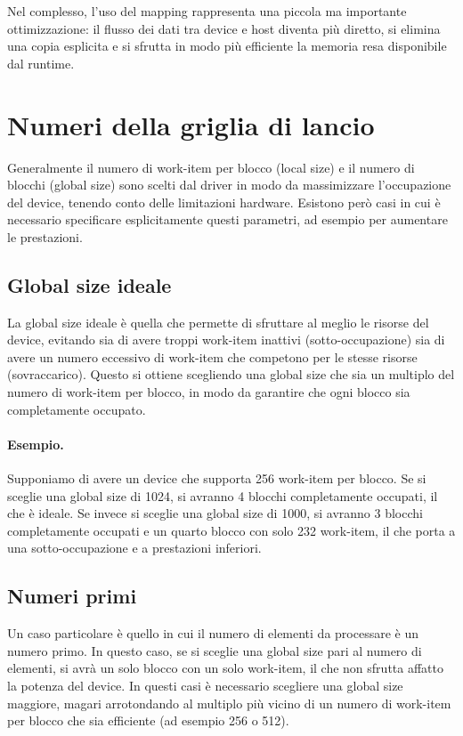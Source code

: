 Nel complesso, l’uso del mapping rappresenta una piccola ma importante ottimizzazione: il flusso dei dati tra device e host diventa più diretto, si elimina una copia esplicita e si sfrutta in modo più efficiente la memoria resa disponibile dal runtime.

\section{Numeri della griglia di lancio}
Generalmente il numero di work-item per blocco (local size) e il numero di blocchi (global size) sono scelti dal driver in modo da massimizzare l’occupazione del device, tenendo conto delle limitazioni hardware. Esistono però casi in cui è necessario specificare esplicitamente questi parametri, ad esempio per aumentare le prestazioni.

\subsection{Global size ideale}
La global size ideale è quella che permette di sfruttare al meglio le risorse del device, evitando sia di avere troppi work-item inattivi (sotto-occupazione) sia di avere un numero eccessivo di work-item che competono per le stesse risorse (sovraccarico). Questo si ottiene scegliendo una global size che sia un multiplo del numero di work-item per blocco, in modo da garantire che ogni blocco sia completamente occupato.

\paragraph{Esempio.}
Supponiamo di avere un device che supporta 256 work-item per blocco. Se si sceglie una global size di 1024, si avranno 4 blocchi completamente occupati, il che è ideale. Se invece si sceglie una global size di 1000, si avranno 3 blocchi completamente occupati e un quarto blocco con solo 232 work-item, il che porta a una sotto-occupazione e a prestazioni inferiori.

\subsection{Numeri primi}
Un caso particolare è quello in cui il numero di elementi da processare è un numero primo. In questo caso, se si sceglie una global size pari al numero di elementi, si avrà un solo blocco con un solo work-item, il che non sfrutta affatto la potenza del device. In questi casi è necessario scegliere una global size maggiore, magari arrotondando al multiplo più vicino di un numero di work-item per blocco che sia efficiente (ad esempio 256 o 512).

